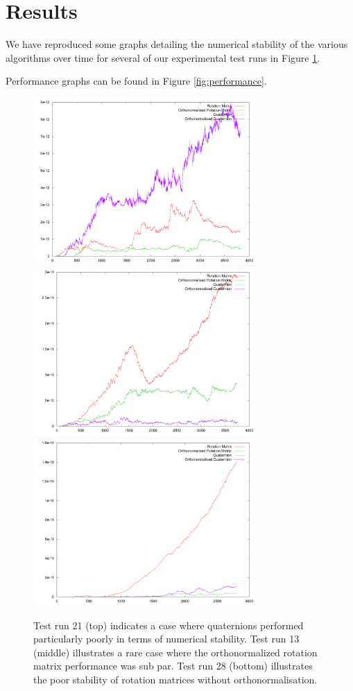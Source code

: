 \documentclass{acm_proc_article-sp}
\begin{document}
\section{Results} 

We have reproduced some graphs detailing the numerical stability of the various algorithms over time for several of our experimental test runs in Figure \ref{fig:stability}.

Performance graphs can be found in Figure \ref{fig:performance}.

\begin{figure}[htpb]
\includegraphics[width=8.5cm]{plots/stability_plot_21.png}
\includegraphics[width=8.5cm]{plots/stability_plot_13.png}
\includegraphics[width=8.5cm]{plots/stability_plot_28.png}
\caption{Test run 21 (top) indicates a case where quaternions performed particularly poorly in terms of numerical stability.
Test run 13 (middle) illustrates a rare case where the orthonormalized rotation matrix performance was sub par.
Test run 28 (bottom) illustrates the poor stability of rotation matrices without orthonormalisation.}
\label{fig:stability}
\end{figure}
\end{document}
